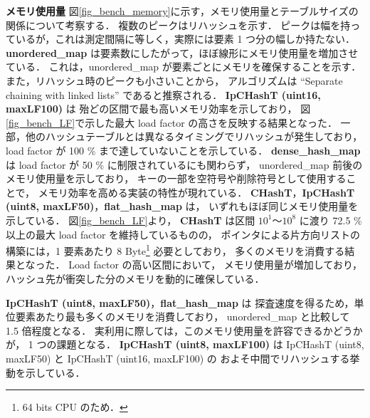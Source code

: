 %
{\bf メモリ使用量}
\samepage\newline\indent
図\ref{fig_bench_memory}に示す，メモリ使用量とテーブルサイズの関係について考察する．
複数のピークはリハッシュを示す．
ピークは幅を持っているが，これは測定間隔に等しく，実際には要素 1 つ分の幅しか持たない．
{\bf unordered\_map} は要素数にしたがって，ほぼ線形にメモリ使用量を増加させている．
これは，unordered\_map が要素ごとにメモリを確保することを示す．
また，リハッシュ時のピークも小さいことから，
アルゴリズムは ``Separate chaining with linked lists'' であると推察される．
{\bf IpCHashT (uint16, maxLF100)} は
殆どの区間で最も高いメモリ効率を示しており，
図\ref{fig_bench_LF}で示した最大 load factor の高さを反映する結果となった．
一部，他のハッシュテーブルとは異なるタイミングでリハッシュが発生しており，
load factor が 100 \% まで達していないことを示している．
{\bf dense\_hash\_map} は
load factor が 50 \% に制限されているにも関わらず，
unordered\_map 前後のメモリ使用量を示しており，
キーの一部を空符号や削除符号として使用することで，
メモリ効率を高める実装の特性が現れている．
{\bf CHashT}，{\bf IpCHashT (uint8, maxLF50)}，{\bf flat\_hash\_map} は，
いずれもほぼ同じメモリ使用量を示している．
図\ref{fig_bench_LF}より，
{\bf CHashT} は区間 $10^1〜10^8$ に渡り 72.5 \% 以上の最大 load factor を維持しているものの，
ポインタによる片方向リストの構築には，1 要素あたり 8 Byte\footnote{64 bits CPU のため．} 必要としており，
多くのメモリを消費する結果となった．
Load factor の高い区間において，
メモリ使用量が増加しており，
ハッシュ先が衝突した分のメモリを動的に確保している．

\noindent
{\bf IpCHashT (uint8, maxLF50)}，{\bf flat\_hash\_map} は
探査速度を得るため，単位要素あたり最も多くのメモリを消費しており，
unordered\_map と比較して 1.5 倍程度となる．
実利用に際しては，このメモリ使用量を許容できるかどうかが，
1 つの課題となる．
{\bf IpCHashT (uint8, maxLF100)} は
IpCHashT (uint8, maxLF50) と IpCHashT (uint16, maxLF100) の
およそ中間でリハッシュする挙動を示している．

